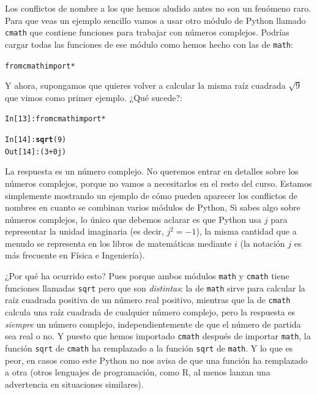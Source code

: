 \documentclass[10pt,a4paper]{article}\usepackage[]{graphicx}\usepackage[]{color}
\makeatletter
\newcommand{\hlkwd}[1]{\textcolor[rgb]{0.737,0.353,0.396}{\textbf{#1}}}%
\newenvironment{kframe}{%
 \def\at@end@of@kframe{}%
 \ifinner\ifhmode%
  \def\at@end@of@kframe{\end{minipage}}%
  \begin{minipage}{\columnwidth}%
 \fi\fi%
 \def\FrameCommand##1{\hskip\@totalleftmargin \hskip-\fboxsep
 \colorbox{shadecolor}{##1}\hskip-\fboxsep
     \hskip-\linewidth \hskip-\@totalleftmargin \hskip\columnwidth}%
 \MakeFramed {\advance\hsize-\width
   \@totalleftmargin\z@ \linewidth\hsize
   \@setminipage}}%
 {\par\unskip\endMakeFramed%
 \at@end@of@kframe}
\newenvironment{knitrout}{}{} %
\newcounter {cont01}
\makeatother
\begin{document}
Los conflictos de nombre a los que hemos aludido antes no son un fenómeno raro. Para que veas un ejemplo sencillo vamos a usar otro módulo de Python llamado {\tt cmath} que contiene funciones para trabajar con números complejos. Podrías cargar todas las funciones de ese módulo como hemos hecho con las de {\tt math}:
\begin{knitrout}
\color{fgcolor}\begin{kframe}
\begin{alltt}
from cmath import *
\end{alltt}
\end{kframe}
\end{knitrout}
Y ahora, supongamos que quieres volver a calcular la misma raíz cuadrada $\sqrt{9}$ que vimos como primer ejemplo. ¿Qué sucede?:
\begin{knitrout}
\color{fgcolor}\begin{kframe}
\begin{alltt}
In [13]: from cmath import *

In [14]: \hlkwd{sqrt}(9)
Out[14]: (3+0j)
\end{alltt}
\end{kframe}
\end{knitrout}
La respuesta es un número complejo. No queremos entrar en detalles sobre los números complejos, porque no vamos a necesitarlos en el resto del curso. Estamos simplemente mostrando un ejemplo de cómo pueden aparecer los conflictos de nombres en cuanto se combinan varios módulos de Python, Si sabes algo sobre números complejos, lo único que debemos aclarar es que Python usa $j$ para representar la unidad imaginaria (es decir, $j^2 = -1$), la misma cantidad que a menudo se representa en los libros de matemáticas mediante $i$ (la notación $j$ es más frecuente en Física e Ingeniería).

¿Por qué ha ocurrido esto? Pues porque ambos módulos {\tt math} y {\tt cmath} tiene funciones llamadas {\tt sqrt} pero que son {\em distintas}: la de {\tt math} sirve para calcular la raíz cuadrada positiva de un número real positivo, mientras que la de {\tt cmath} calcula una raíz cuadrada de cualquier número complejo, pero la respuesta es {\em siempre} un número complejo, independientemente de que el número de partida sea real o no. Y puesto que hemos importado {\tt cmath} después de importar {\tt math}, la función {\tt sqrt} de {\tt cmath} ha remplazado a la función {\tt sqrt} de {\tt math}. Y lo que es peor, en casos como este Python no nos avisa de que una función ha remplazado a otra (otros lenguajes de programación, como R, al menos lanzan una advertencia en situaciones similares).
\end{document}
